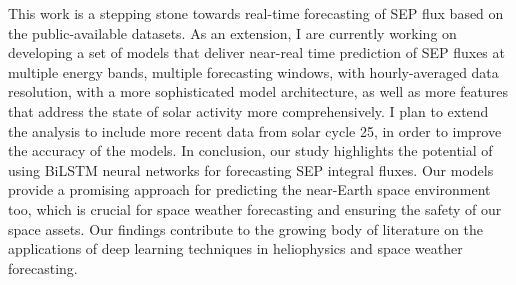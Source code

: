 This work is a stepping stone towards real-time forecasting of SEP flux based on the public-available datasets. As an extension, I are currently working on developing a set of models that deliver near-real time prediction of SEP fluxes at multiple energy bands, multiple forecasting windows, with hourly-averaged data resolution, with a more sophisticated model architecture, as well as more features that address the state of solar activity more comprehensively. 
I plan to extend the analysis to include more recent data from solar cycle 25, in order to improve the accuracy of the models.
In conclusion, our study highlights the potential of using BiLSTM neural networks for forecasting SEP integral fluxes. Our models provide a promising approach for predicting the near-Earth space environment too, which is crucial for space weather forecasting and ensuring the safety of our space assets. Our findings contribute to the growing body of literature on the applications of deep learning techniques in heliophysics and space weather forecasting.
